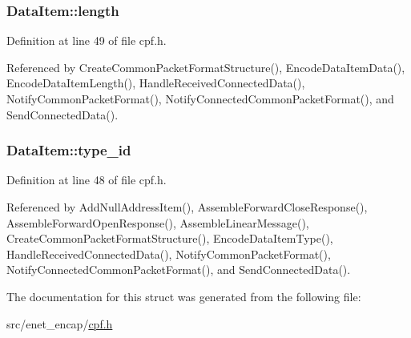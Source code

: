 \hypertarget{structDataItem_a70de504e7692ab2c73be4c96911c9b05}{
\subsubsection[{length}]{ {\bf \-Data\-Item\-::length}}}\label{de/d71/structDataItem_a70de504e7692ab2c73be4c96911c9b05}


\-Definition at line 49 of file cpf.\-h.



\-Referenced by \-Create\-Common\-Packet\-Format\-Structure(), \-Encode\-Data\-Item\-Data(), \-Encode\-Data\-Item\-Length(), \-Handle\-Received\-Connected\-Data(), \-Notify\-Common\-Packet\-Format(), \-Notify\-Connected\-Common\-Packet\-Format(), and \-Send\-Connected\-Data().

\hypertarget{structDataItem_acf4b53bdfe8766830d313e9c7e1cf5dc}{
\subsubsection[{type\-\_\-id}]{ {\bf \-Data\-Item\-::type\-\_\-id}}}\label{de/d71/structDataItem_acf4b53bdfe8766830d313e9c7e1cf5dc}


\-Definition at line 48 of file cpf.\-h.



\-Referenced by \-Add\-Null\-Address\-Item(), \-Assemble\-Forward\-Close\-Response(), \-Assemble\-Forward\-Open\-Response(), \-Assemble\-Linear\-Message(), \-Create\-Common\-Packet\-Format\-Structure(), \-Encode\-Data\-Item\-Type(), \-Handle\-Received\-Connected\-Data(), \-Notify\-Common\-Packet\-Format(), \-Notify\-Connected\-Common\-Packet\-Format(), and \-Send\-Connected\-Data().



\-The documentation for this struct was generated from the following file\-:\begin{DoxyCompactItemize}
\item 
src/enet\-\_\-encap/\hyperlink{cpf_8h}{cpf.\-h}\end{DoxyCompactItemize}
